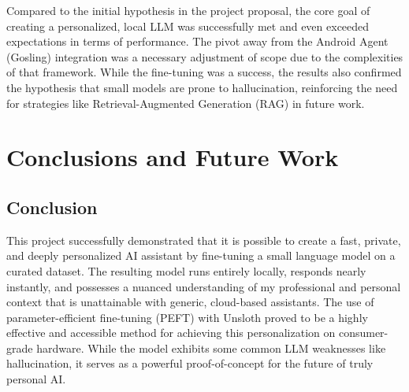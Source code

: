 \documentclass[conference]{IEEEtran}
\begin{document}
Compared to the initial hypothesis in the project proposal, the core goal of creating a personalized, local LLM was successfully met and even exceeded expectations in terms of performance. The pivot away from the Android Agent (Gosling) integration was a necessary adjustment of scope due to the complexities of that framework. While the fine-tuning was a success, the results also confirmed the hypothesis that small models are prone to hallucination, reinforcing the need for strategies like Retrieval-Augmented Generation (RAG) in future work.

\section{Conclusions and Future Work}

\subsection{Conclusion}
This project successfully demonstrated that it is possible to create a fast, private, and deeply personalized AI assistant by fine-tuning a small language model on a curated dataset. The resulting model runs entirely locally, responds nearly instantly, and possesses a nuanced understanding of my professional and personal context that is unattainable with generic, cloud-based assistants. The use of parameter-efficient fine-tuning (PEFT) with Unsloth proved to be a highly effective and accessible method for achieving this personalization on consumer-grade hardware. While the model exhibits some common LLM weaknesses like hallucination, it serves as a powerful proof-of-concept for the future of truly personal AI.
\end{document}
